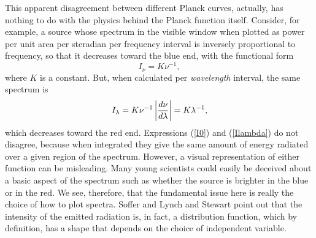 \documentclass[12pt,aps,prb,preprint]{revtex4}   %
\begin{document}
This apparent disagreement between different Planck curves, actually, has nothing to do with the physics behind the Planck function itself.  Consider, for example, a source whose spectrum in the visible window
when plotted as power per unit area per steradian per frequency interval is inversely proportional to frequency, so that it decreases toward the blue end, with the functional form
\begin{equation}
I_\nu = K \nu^{-1},
\label{I0}
\end{equation}
where $K$ is a constant.  But, when calculated per {\it wavelength} interval, the same spectrum is
\begin{equation}
I_\lambda = K \nu^{-1} \left|{d\nu \over d\lambda}\right| = K \lambda^{-1},
\label{Ilambda}
\end{equation}
which decreases toward the red end.  Expressions (\ref{I0}) and (\ref{Ilambda}) do not disagree, because when integrated they give the same amount of energy radiated over a given region of the spectrum.  However, a visual representation of either function can be misleading.  Many young scientists could easily be deceived about a basic aspect of the spectrum such as whether the source
is brighter in the blue or in the red.  We see, therefore, that the fundamental issue here is really the choice of how to plot spectra.  Soffer and Lynch\cite{SL} and Stewart\cite{Stewart} point out that the intensity of the emitted radiation is, in fact, a distribution function, which by definition, has a shape that depends on the choice of independent variable.
\end{document}
